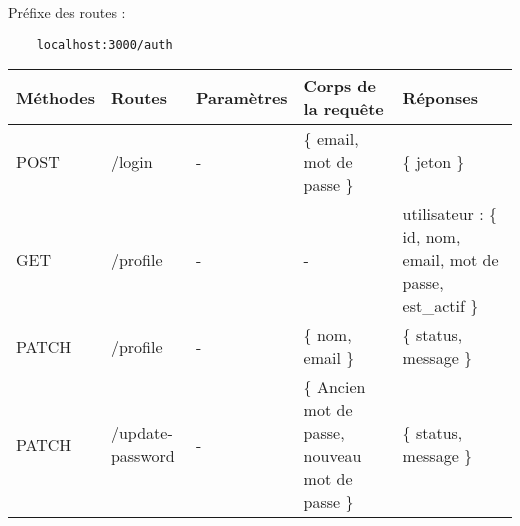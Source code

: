 Préfixe des routes :
\begin{lstlisting}
    localhost:3000/auth
\end{lstlisting}

\begin{center}
    \begin{tabularx}{1\textwidth} {
        | >{\raggedright\arraybackslash}X
        | >{\centering\arraybackslash}X
        | >{\centering\arraybackslash}X
        | >{\centering\arraybackslash}X
        | >{\raggedleft\arraybackslash}X | }
        \hline
            Méthodes & Routes & Paramètres & Corps de la requête & Réponses \\
        \hline
            POST  & /login & - & \{ email, mot de passe \}  & \{ jeton \} \\
        \hline
            GET  & /profile & - & - &  utilisateur : \{ id, nom, email, mot de passe, est\_actif \}  \\
        \hline
            PATCH  & /profile & - & \{ nom, email \} & \{ status, message \} \\
        \hline
            PATCH  & /update-password & - & \{ Ancien mot de passe, nouveau mot de passe \} & \{ status, message \} \\
        \hline
    \end{tabularx}
\end{center}
\pagebreak


